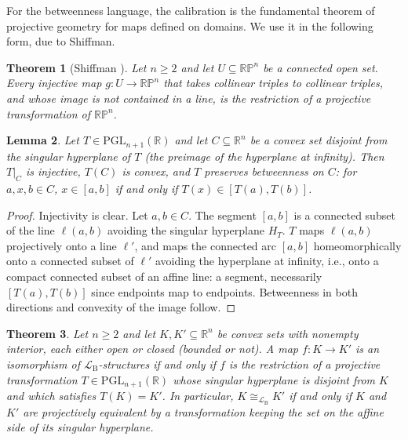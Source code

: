 \documentclass[11pt]{amsart}
\newtheorem{theorem}{Theorem}[section]
\newtheorem{lemma}[theorem]{Lemma}
\theoremstyle{definition}
\newcommand{\R}{\mathbb{R}}
\newcommand{\RP}{\mathbb{RP}}
\newcommand{\LB}{\mathcal{L}_{\mathrm{B}}}
\newcommand{\PGL}{\mathrm{PGL}}
\begin{document}
For the betweenness language, the calibration is the fundamental theorem of
projective geometry for maps defined on domains. We use it in the following
form, due to Shiffman.

\begin{theorem}[Shiffman \cite{Shiffman95}]\label{thm:shiffman}
Let $n\ge 2$ and let $U\subseteq\RP^n$ be a connected open set. Every
injective map $g\colon U\to\RP^n$ that takes collinear triples to collinear
triples, and whose image is not contained in a line, is the restriction of a
projective transformation of $\RP^n$.
\end{theorem}

\begin{lemma}\label{lem:proj-betweenness}
Let $T\in\PGL_{n+1}(\R)$ and let $C\subseteq\R^n$ be a convex set disjoint
from the singular hyperplane of $T$ (the preimage of the hyperplane at
infinity). Then $T|_C$ is injective, $T(C)$ is convex, and $T$ preserves
betweenness on $C$: for $a,x,b\in C$, $x\in[a,b]$ if and only if
$T(x)\in[T(a),T(b)]$.
\end{lemma}

\begin{proof}
Injectivity is clear. Let $a,b\in C$. The segment $[a,b]$ is a connected
subset of the line $\ell(a,b)$ avoiding the singular hyperplane $H_T$. $T$
maps $\ell(a,b)$ projectively onto a line $\ell'$, and maps the connected arc
$[a,b]$ homeomorphically onto a connected subset of $\ell'$ avoiding the
hyperplane at infinity, i.e., onto a compact connected subset of an affine
line: a segment, necessarily $[T(a),T(b)]$ since endpoints map to endpoints.
Betweenness in both directions and convexity of the image follow.
\end{proof}

\begin{theorem}\label{thm:iso-projective}
Let $n\ge2$ and let $K,K'\subseteq\R^n$ be convex sets with nonempty
interior, each either open or closed (bounded or not). A map
$f\colon K\to K'$ is an isomorphism of $\LB$-structures if and only if $f$ is
the restriction of a projective transformation $T\in\PGL_{n+1}(\R)$ whose
singular hyperplane is disjoint from $K$ and which satisfies $T(K)=K'$. In
particular, $K\cong_{\LB}K'$ if and only if $K$ and $K'$ are projectively
equivalent by a transformation keeping the set on the affine side of its
singular hyperplane.
\end{theorem}
\end{document}
